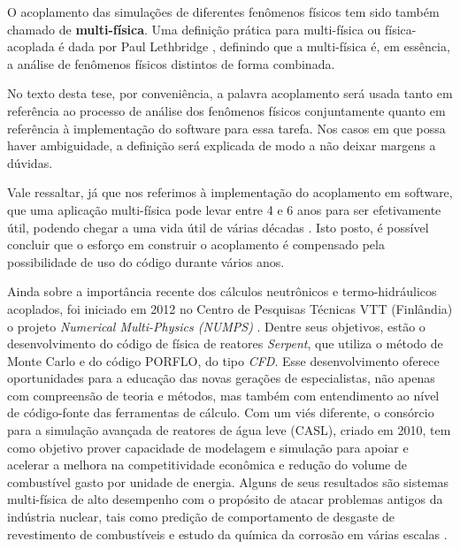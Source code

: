 O acoplamento das simulações de diferentes fenômenos físicos tem sido também chamado de
\textbf{multi-física}. 
Uma definição prática para multi-física ou física-acoplada é dada por Paul Lethbridge \cite{Lethbridge2005}, definindo que 
a multi-física é, em essência, a análise de fenômenos físicos distintos de forma combinada.

No texto desta tese, 
por conveniência, a palavra acoplamento será usada tanto em referência ao processo de análise dos fenômenos físicos conjuntamente 
quanto em referência à implementação do software para essa tarefa. Nos casos em que possa haver ambiguidade, 
a definição será explicada de modo a não deixar margens a dúvidas.

Vale ressaltar, já que nos referimos à implementação do acoplamento em software, que uma aplicação multi-física 
pode levar entre 4 e 6 anos para ser efetivamente útil, podendo chegar a uma vida útil de várias décadas 
\cite{Graham2004}. Isto posto, é possível concluir que o esforço em construir o acoplamento é compensado 
pela possibilidade de uso do código durante vários anos.

Ainda sobre a importância recente dos cálculos neutrônicos e termo-hidráulicos acoplados, foi iniciado em 2012
no Centro de Pesquisas Técnicas VTT (Finlândia) o projeto \textit{Numerical Multi-Physics (NUMPS)} \cite{Leppanen2015}.
Dentre seus objetivos, estão o desenvolvimento do código de física de reatores \textit{Serpent}, que utiliza o método de
Monte Carlo e do código PORFLO, do tipo \textit{CFD}. Esse desenvolvimento oferece oportunidades para a educação das novas
gerações de especialistas, não apenas com compreensão de teoria e métodos, mas também com entendimento ao nível de
código-fonte das ferramentas de cálculo. Com um viés diferente, o consórcio para a simulação avançada de reatores
de água leve (CASL), criado em 2010, tem como objetivo prover capacidade de modelagem e simulação para apoiar e acelerar
a melhora na competitividade econômica e redução do volume de combustível gasto por unidade de energia. Alguns de seus
resultados são sistemas multi-física de alto desempenho com o propósito de atacar problemas antigos da indústria nuclear,
tais como predição de comportamento de desgaste de revestimento de combustíveis e estudo da química da corrosão em várias
escalas \cite{Turinsky2016}.


